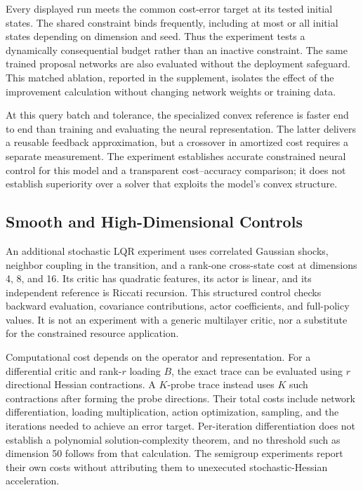 Every displayed run meets the common cost-error target at its tested initial states. The shared constraint binds frequently, including at most or all initial states depending on dimension and seed. Thus the experiment tests a dynamically consequential budget rather than an inactive constraint. The same trained proposal networks are also evaluated without the deployment safeguard. This matched ablation, reported in the supplement, isolates the effect of the improvement calculation without changing network weights or training data.

At this query batch and tolerance, the specialized convex reference is faster end to end than training and evaluating the neural representation. The latter delivers a reusable feedback approximation, but a crossover in amortized cost requires a separate measurement. The experiment establishes accurate constrained neural control for this model and a transparent cost--accuracy comparison; it does not establish superiority over a solver that exploits the model's convex structure.

\subsection{Smooth and High-Dimensional Controls}
An additional stochastic LQR experiment uses correlated Gaussian shocks, neighbor coupling in the transition, and a rank-one cross-state cost at dimensions 4, 8, and 16. Its critic has quadratic features, its actor is linear, and its independent reference is Riccati recursion. This structured control checks backward evaluation, covariance contributions, actor coefficients, and full-policy values. It is not an experiment with a generic multilayer critic, nor a substitute for the constrained resource application.

Computational cost depends on the operator and representation. For a differential critic and rank-$r$ loading $B$, the exact trace can be evaluated using $r$ directional Hessian contractions. A $K$-probe trace instead uses $K$ such contractions after forming the probe directions. Their total costs include network differentiation, loading multiplication, action optimization, sampling, and the iterations needed to achieve an error target. Per-iteration differentiation does not establish a polynomial solution-complexity theorem, and no threshold such as dimension 50 follows from that calculation. The semigroup experiments report their own costs without attributing them to unexecuted stochastic-Hessian acceleration.
